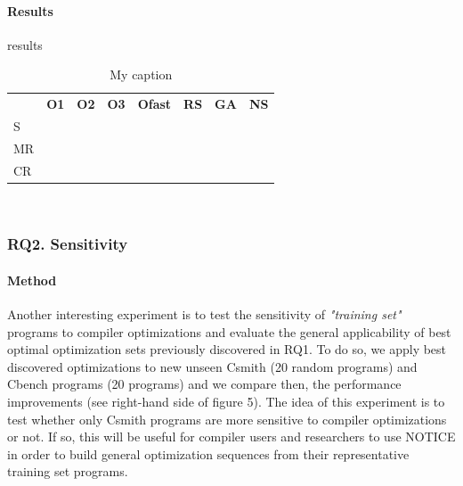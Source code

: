 \paragraph{Results}
results



\begin{table}[h]
	\centering
	\caption{My caption}
	\label{my-label}
	\begin{tabular}{|l|l|l|l|l|l|l|c|}
		\hline
		& \textbf{O1}                    & \textbf{O2}                    & \textbf{O3}                    & \textbf{Ofast}                 & \textbf{RS}                    & \textbf{GA}                    & 
		\textbf{NS} \\
		\hhline{|=|=|=|=|=|=|=|=|}
		S  & \multicolumn{1}{c|}{} & \multicolumn{1}{c|}{} & \multicolumn{1}{c|}{} & \multicolumn{1}{c|}{} & \multicolumn{1}{c|}{} & \multicolumn{1}{c|}{} &    \\ \hline
		MR &                       &                       &                       &                       &                       &                       &    \\ \hline
		CR &                       &                       &                       &                       &                       &                       &    \\ \hline
	\end{tabular}
\end{table}
\

\noindent{}
\subsubsection{RQ2. Sensitivity}
\paragraph{Method}
Another interesting experiment is to test the sensitivity of \textit{"training set"} programs to compiler optimizations and evaluate the general applicability of best optimal optimization sets previously discovered in RQ1. To do so, we apply best discovered optimizations to new unseen Csmith (20 random programs) and Cbench programs (20 programs) and we compare then, the performance improvements (see right-hand side of figure 5). The idea of this experiment is to test whether only Csmith programs are more sensitive to compiler optimizations or not. If so, this will be useful for compiler users and researchers to use NOTICE in order to build general optimization sequences from their representative training set programs.

